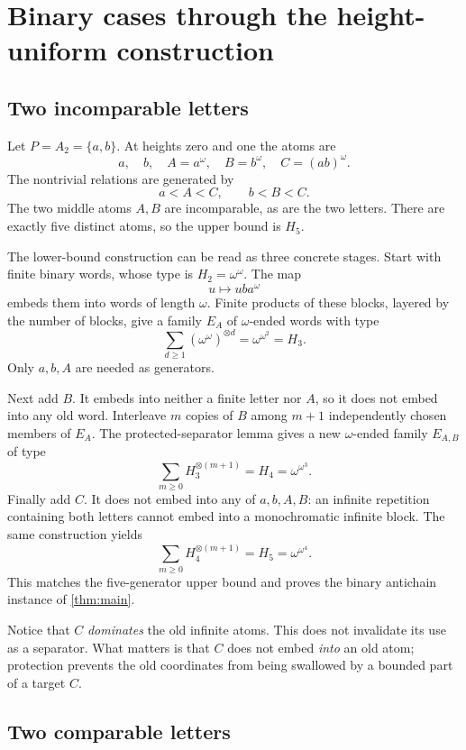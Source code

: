 \documentclass[11pt,a4paper]{article}
\numberwithin{equation}{section}
\theoremstyle{definition}
\theoremstyle{remark}
\begin{document}
\section{Binary cases through the height-uniform construction}\label{height:sec:binary}

\subsection{Two incomparable letters}

Let $P=A_2=\{a,b\}$. At heights zero and one the atoms are
\[
  a,\quad b,\quad A=a^\omega,\quad B=b^\omega,\quad C=(ab)^\omega.
\]
The nontrivial relations are generated by
\[
  a<A<C,\qquad b<B<C.
\]
The two middle atoms $A,B$ are incomparable, as are the two letters.
There are exactly five distinct atoms, so the upper bound is $H_5$.

The lower-bound construction can be read as three concrete stages.
Start with finite binary words, whose type is $H_2=\omega^\omega$.
The map
\[
  u\longmapsto u b a^\omega
\]
embeds them into words of length $\omega$. Finite products of these blocks,
layered by the number of blocks, give a family $E_A$ of $\omega$-ended
words with type
\[
  \sum_{d\ge1}(\omega^\omega)^{\otimes d}
  =\omega^{\omega^2}=H_3.
\]
Only $a,b,A$ are needed as generators.

Next add $B$. It embeds into neither a finite letter nor $A$, so it does
not embed into any old word. Interleave $m$ copies of $B$ among $m+1$
independently chosen members of $E_A$. The protected-separator lemma gives
a new $\omega$-ended family $E_{A,B}$ of type
\[
  \sum_{m\ge0}H_3^{\otimes(m+1)}=H_4=\omega^{\omega^3}.
\]
Finally add $C$. It does not embed into any of $a,b,A,B$: an infinite
repetition containing both letters cannot embed into a monochromatic
infinite block. The same construction yields
\[
  \sum_{m\ge0}H_4^{\otimes(m+1)}=H_5=\omega^{\omega^4}.
\]
This matches the five-generator upper bound and proves the binary
antichain instance of \cref{thm:main}.

Notice that $C$ \emph{dominates} the old infinite atoms. This does not
invalidate its use as a separator. What matters is that $C$ does not
embed \emph{into} an old atom; protection prevents the old coordinates
from being swallowed by a bounded part of a target $C$.

\subsection{Two comparable letters}
\end{document}

